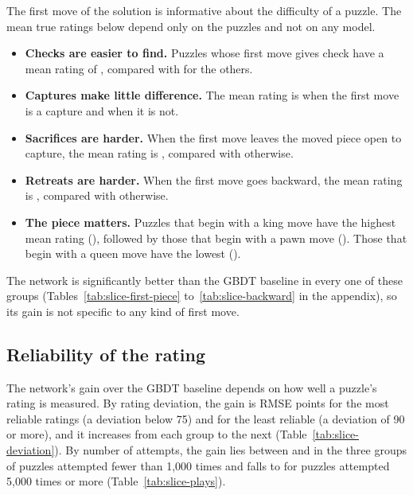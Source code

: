 \documentclass[11pt]{article}
\begin{document}
The first move of the solution is informative about the difficulty of a
puzzle. The mean true ratings below depend only on the puzzles and not on
any model.
\begin{itemize}
\item \textbf{Checks are easier to find.} Puzzles whose first move gives
check have a mean rating of , compared with
 for the others.
\item \textbf{Captures make little difference.} The mean rating is
 when the first move is a capture and
 when it is not.
\item \textbf{Sacrifices are harder.} When the first move leaves the moved
piece open to capture, the mean rating is ,
compared with  otherwise.
\item \textbf{Retreats are harder.} When the first move goes backward, the
mean rating is , compared with
 otherwise.
\item \textbf{The piece matters.} Puzzles that begin with a king move have
the highest mean rating (), followed by
those that begin with a pawn move ().
Those that begin with a queen move have the lowest
().
\end{itemize}
The network is significantly better than the GBDT baseline in every one of
these groups (Tables~\ref{tab:slice-first-piece}
to~\ref{tab:slice-backward} in the appendix), so its gain is not specific to
any kind of first move.

\subsection{Reliability of the rating}

The network's gain over the GBDT baseline depends on how well a puzzle's
rating is measured. By rating deviation, the gain is
 RMSE points for the most reliable ratings (a
deviation below 75) and  for the least reliable
(a deviation of 90 or more), and it increases from each group to the next
(Table~\ref{tab:slice-deviation}). By number of attempts, the gain lies
between  and  in the
three groups of puzzles attempted fewer than 1{,}000 times and falls to
 for puzzles attempted 5{,}000 times or more
(Table~\ref{tab:slice-plays}).
\end{document}
